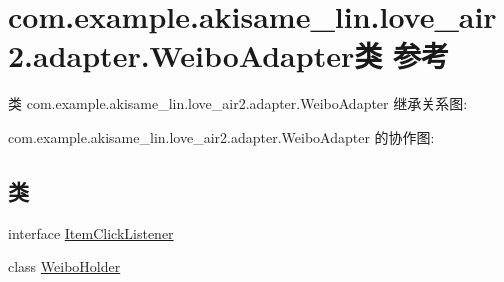 \hypertarget{classcom_1_1example_1_1akisame__lin_1_1love__air2_1_1adapter_1_1_weibo_adapter}{}\section{com.\+example.\+akisame\+\_\+lin.\+love\+\_\+air2.\+adapter.\+Weibo\+Adapter类 参考}
\label{classcom_1_1example_1_1akisame__lin_1_1love__air2_1_1adapter_1_1_weibo_adapter}


类 com.\+example.\+akisame\+\_\+lin.\+love\+\_\+air2.\+adapter.\+Weibo\+Adapter 继承关系图\+:


com.\+example.\+akisame\+\_\+lin.\+love\+\_\+air2.\+adapter.\+Weibo\+Adapter 的协作图\+:
\subsection*{类}
\begin{DoxyCompactItemize}
\item 
interface \mbox{\hyperlink{interfacecom_1_1example_1_1akisame__lin_1_1love__air2_1_1adapter_1_1_weibo_adapter_1_1_item_click_listener}{Item\+Click\+Listener}}
\item 
class \mbox{\hyperlink{classcom_1_1example_1_1akisame__lin_1_1love__air2_1_1adapter_1_1_weibo_adapter_1_1_weibo_holder}{Weibo\+Holder}}
\end{DoxyCompactItemize}

